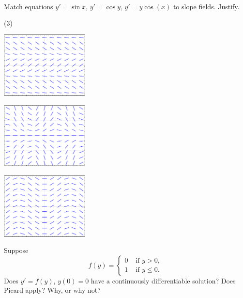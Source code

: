 \begin{samepage}
\begin{exercise}
Match equations $y'=\sin x$, $y'=\cos y$, $y' = y\cos(x)$ to slope fields.
Justify.
\begin{tasks}(3)
\task
\parbox[c]{1.75in}{\includegraphics[width=1.75in]{figures/yprimecosyslope}}
\task
\parbox[c]{1.75in}{\includegraphics[width=1.75in]{figures/yprimecosxyslope}}
\task
\parbox[c]{1.75in}{\includegraphics[width=1.75in]{figures/yprimesinxslope}}
\end{tasks}
\end{exercise}
\end{samepage}

\begin{exercise}[tricky]
Suppose
\begin{equation*}
f(y) =
\begin{cases}
0 & \text{ if $y > 0$}, \\
1 & \text{ if $y \leq 0$} .
\end{cases}
\end{equation*}
Does $y' = f(y)$, $y(0) = 0$ have a continuously differentiable solution?  Does Picard apply?  Why, or why not?
\end{exercise}

